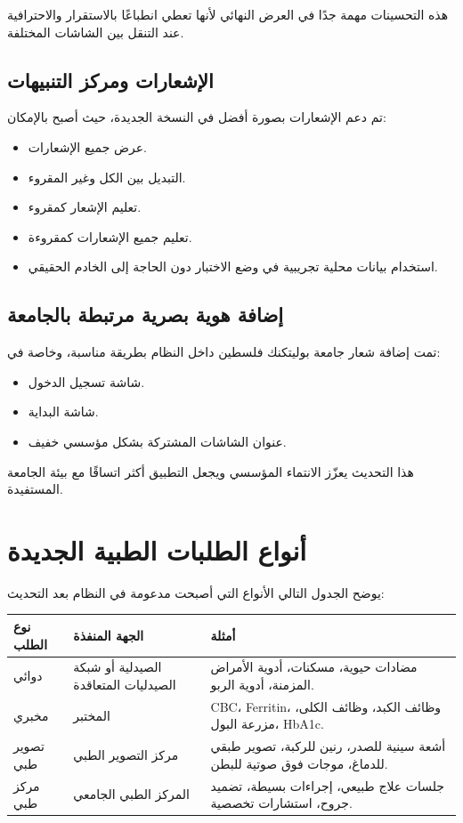 \documentclass[12pt,a4paper]{report}
\begin{document}
هذه التحسينات مهمة جدًا في العرض النهائي لأنها تعطي انطباعًا بالاستقرار والاحترافية عند التنقل بين الشاشات المختلفة.

\section{الإشعارات ومركز التنبيهات}

تم دعم الإشعارات بصورة أفضل في النسخة الجديدة، حيث أصبح بالإمكان:

\begin{itemize}[itemsep=4pt]
  \item عرض جميع الإشعارات.
  \item التبديل بين الكل وغير المقروء.
  \item تعليم الإشعار كمقروء.
  \item تعليم جميع الإشعارات كمقروءة.
  \item استخدام بيانات محلية تجريبية في وضع الاختبار دون الحاجة إلى الخادم الحقيقي.
\end{itemize}

\section{إضافة هوية بصرية مرتبطة بالجامعة}

تمت إضافة شعار جامعة بوليتكنك فلسطين داخل النظام بطريقة مناسبة، وخاصة في:

\begin{itemize}[itemsep=4pt]
  \item شاشة تسجيل الدخول.
  \item شاشة البداية.
  \item عنوان الشاشات المشتركة بشكل مؤسسي خفيف.
\end{itemize}

هذا التحديث يعزّز الانتماء المؤسسي ويجعل التطبيق أكثر اتساقًا مع بيئة الجامعة المستفيدة.

\chapter{أنواع الطلبات الطبية الجديدة}

يوضح الجدول التالي الأنواع التي أصبحت مدعومة في النظام بعد التحديث:

\begin{longtable}{>{\raggedleft\arraybackslash}p{3.5cm} >{\raggedleft\arraybackslash}p{4cm} >{\raggedleft\arraybackslash}p{6.5cm}}
\toprule
\textbf{نوع الطلب} & \textbf{الجهة المنفذة} & \textbf{أمثلة} \\
\midrule
\endhead
دوائي & الصيدلية أو شبكة الصيدليات المتعاقدة & مضادات حيوية، مسكنات، أدوية الأمراض المزمنة، أدوية الربو. \\
مخبري & المختبر & \textenglish{CBC}، \textenglish{Ferritin}، وظائف الكبد، وظائف الكلى، مزرعة البول، \textenglish{HbA1c}. \\
تصوير طبي & مركز التصوير الطبي & أشعة سينية للصدر، رنين للركبة، تصوير طبقي للدماغ، موجات فوق صوتية للبطن. \\
مركز طبي & المركز الطبي الجامعي & جلسات علاج طبيعي، إجراءات بسيطة، تضميد جروح، استشارات تخصصية. \\
\bottomrule
\end{longtable}
\end{document}
